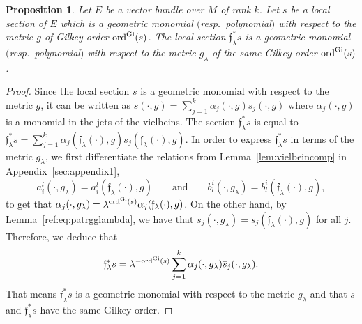 \documentclass[pdftex]{sigma}
\numberwithin{equation}{section}
\newtheorem{prop}[thm]{Proposition}
\theoremstyle{definition}
\begin{document}
\begin{prop} \label{pro:flambdas} Let $E$ be a vector bundle over $M$ of rank $k$. Let $s$ be a local section of $E$ which is a geometric monomial $($resp.\ polynomial$)$ with respect to the metric $g$ of Gilkey order ${\rm ord}^{\rm Gi}(s)$. The local section $\mathfrak{f}_\lambda^*s$ is a geometric monomial $($resp.\ polynomial$)$ with respect to the metric $g_\lambda$ of the same Gilkey order ${\rm ord}^{\rm Gi}(s)$.
\end{prop}
\begin{proof} Since the local section $s$ is a geometric monomial with respect to the metric $g$, it can be written as $s(\cdot,g)=\sum_{j=1}^k \alpha_j(\cdot,g)s_j(\cdot,g)$ where $\alpha_j(\cdot,g)$ is a monomial in the jets of the vielbeins. The section $\mathfrak{f}_\lambda^*s$ is equal to $\mathfrak{f}_\lambda^*s=\sum_{j=1}^k \alpha_j(\mathfrak{f}_\lambda(\cdot),g)s_j(\mathfrak{f}_\lambda(\cdot),g)$. In order to express $\mathfrak{f}_\lambda^*s$ in terms of the metric $g_\lambda$, we first differentiate the relations from Lemma~\ref{lem:vielbeincomp} in Appendix~\ref{sec:appendix1},
\[
a_{i}^{l}(\cdot,g_\lambda)=a_{i}^{l}(\mathfrak{f}_\lambda(\cdot),g) \qquad\text{and}\qquad b_{l}^{i}(\cdot,g_\lambda)=b_{l}^{i}( {\mathfrak f}_\lambda(\cdot),g),
\]
to get that $\alpha_j(\cdot,g_\lambda)=\lambda^{{\rm ord}^{\rm Gi}(s)}\alpha_j(\mathfrak{f}_\lambda(\cdot),g)$. On the other hand, by Lemma~\ref{ref:eq:patrgglambda}, we have that $\overline{s}_j(\cdot,g_\lambda)=s_j(\mathfrak{f}_\lambda(\cdot),g)$ for all $j$. Therefore, we deduce that
\[\mathfrak{f}_\lambda^*s=\lambda^{-{\rm ord}^{\rm Gi}(s)}\sum_{j=1}^k \alpha_j(\cdot,g_\lambda)\overline{s}_j(\cdot,g_\lambda).\]
That means $\mathfrak{f}_\lambda^*s$ is a geometric monomial with respect to the metric $g_\lambda$ and that $s$ and $\mathfrak{f}_\lambda^*s$ have the same Gilkey order.
\end{proof}
\end{document}
